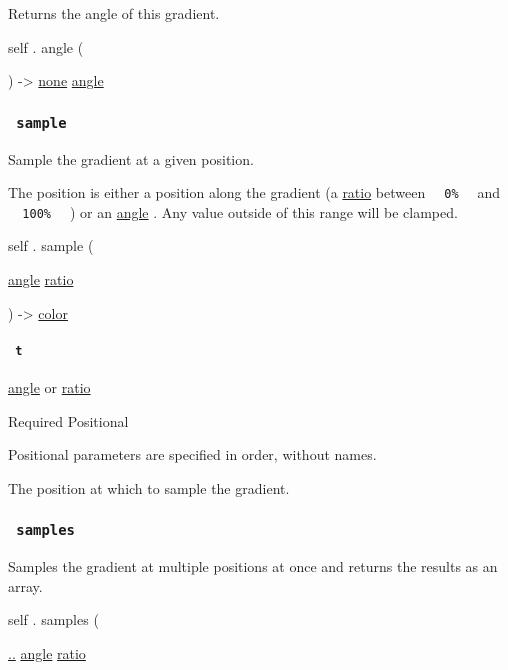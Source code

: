 Returns the angle of this gradient.

self { . } { angle } (

) -\textgreater{} \href{/docs/reference/foundations/none/}{none}
\href{/docs/reference/layout/angle/}{angle}

\subsubsection{\texorpdfstring{\texttt{\ sample\ }}{ sample }}\label{definitions-sample}

Sample the gradient at a given position.

The position is either a position along the gradient (a
\href{/docs/reference/layout/ratio/}{ratio} between
\texttt{\ }{\texttt{\ 0\%\ }}\texttt{\ } and
\texttt{\ }{\texttt{\ 100\%\ }}\texttt{\ } ) or an
\href{/docs/reference/layout/angle/}{angle} . Any value outside of this
range will be clamped.

self { . } { sample } (

{ \href{/docs/reference/layout/angle/}{angle}
\href{/docs/reference/layout/ratio/}{ratio} }

) -\textgreater{} \href{/docs/reference/visualize/color/}{color}

\paragraph{\texorpdfstring{\texttt{\ t\ }}{ t }}\label{definitions-sample-t}

\href{/docs/reference/layout/angle/}{angle} {or}
\href{/docs/reference/layout/ratio/}{ratio}

{Required} {{ Positional }}

\label{definitions-sample-t-positional-tooltip}
Positional parameters are specified in order, without names.

The position at which to sample the gradient.

\subsubsection{\texorpdfstring{\texttt{\ samples\ }}{ samples }}\label{definitions-samples}

Samples the gradient at multiple positions at once and returns the
results as an array.

self { . } { samples } (

{ \hyperref[definitions-samples-parameters-ts]{..}
\href{/docs/reference/layout/angle/}{angle}
\href{/docs/reference/layout/ratio/}{ratio} }

